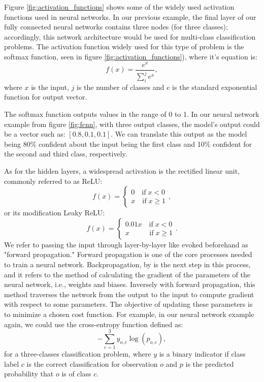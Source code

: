 Figure \ref{fig:activation_functions} shows some of the widely used activation
functions used in neural networks. In our previous example, the final layer of
our fully connected neural networks contains three nodes (for three
classes); accordingly, this network architecture would be used for multi-class
classification problems. The activation function widely used for this type of
problem is the softmax function, seen in figure \ref{fig:activation_functions}),
where it's equation is:
\begin{equation} \label{eq:softmax}
    f(x) = \frac{e^{x}}{\sum^{j}_{i}e^{x}},
\end{equation}
where $x$ is the input, $j$ is the number of classes and $e$ is the standard
exponential function for output vector.


The softmax function outputs values in the range of 0 to 1. In our neural
network example from figure \ref{fig:fcnn}, with three output classes, the
model's output could be a vector such as: $[0.8, 0.1, 0.1]$. We can translate
this output as the model being 80\% confident about the input being the first
class and 10\% confident for the second and third class, respectively.

As for the hidden layers, a widespread activation is the rectified linear unit,
commonly referred to as ReLU:
\begin{equation} \label{eq:relu}
    f(x) =
    \begin{cases}
        0 \quad \textrm{if} \; x < 0 \\
        x \quad \textrm{if} \; x \geq 1
    \end{cases}
    ,
\end{equation}
or its modification Leaky ReLU:
\begin{equation} \label{eq:leaky_relu}
    f(x) =
    \begin{cases}
        0.01x \quad \textrm{if} \; x < 0 \\
        x \quad \quad \; \; \; \textrm{if} \; x \geq 1
    \end{cases}
    .
\end{equation}
We refer to passing the input through layer-by-layer like evoked beforehand as
"forward propagation." Forward propagation is one of the core processes needed
to train a neural network. Backpropagation, by \cite{rumelhart_learning_1986} is
the next step in this process, and it refers to the method of calculating the
gradient of the parameters of the neural network, i.e., weights and biases.
Inversely with forward propagation, this method traverses the network from the
output to the input to compute gradient with respect to some parameters. The
objective of updating these parameters is to minimize a chosen cost function.
For example, in our neural network example again, we could use the cross-entropy
function defined as:
\begin{equation} \label{eq:cross-entropy}
    -\sum^{3}_{c=1}y_{o,c} \log{(p_{o,c})},
\end{equation}
for a three-classes classification problem, where $y$ is a binary indicator if
class label $c$ is the correct classification for observation $o$ and $p$ is the
predicted probability that $o$ is of class $c$.

